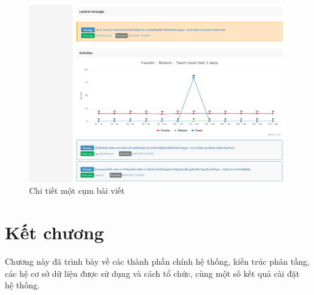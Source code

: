 \begin{figure}[H]
	\centering
	\includegraphics[width=0.96\linewidth]{Chapter3/Chapter3Figs/StoryDetails2}
	\caption{Chi tiết một cụm bài viết}
	\label{fig:storydetail}
\end{figure}

\section{Kết chương}
Chương này đã trình bày về các thành phần chính hệ thống, kiến trúc phân tầng, các hệ cơ sở dữ liệu được sử dụng và cách tổ chức, cùng một số kết quả cài đặt hệ thống.